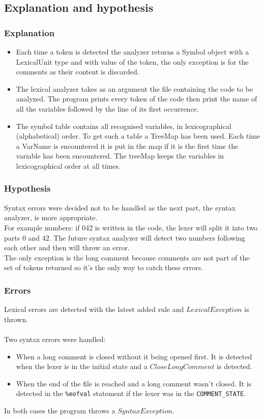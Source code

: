 \documentclass{article}
\begin{document}
\subsection{Explanation and hypothesis}
\subsubsection{Explanation}
\begin{itemize}
    \item Each time a token is detected the analyzer returns a Symbol object with a LexicalUnit type and with value of the token, the only exception is for the comments as their content is discarded.

    \item The lexical analyzer takes as an argument the file containing the code to be analyzed. The program prints every token of the code then print the name of all the variables followed by the line of its first occurrence.

    \item The symbol table contains all recognised variables, in lexicographical (alphabetical) order. To get such a table a TreeMap has been used. Each time a VarName is encountered it is put in the map if it is the first time the variable has been encountered. The treeMap keeps the variables in lexicographical order at all times.
\end{itemize}
\subsubsection{Hypothesis}
Syntax errors were decided not to be handled as the next part, the syntax analyzer, is more appropriate.\\

For example numbers: if 042 is written in the code, the lexer will split it into two parts 0 and 42. The future syntax analyzer will detect two numbers following each other and then will throw an error.\\

The only exception is the long comment because comments are not part of the set of tokens returned so it's the only way to catch these errors.
\subsubsection{Errors}
Lexical errors are detected with the latest added rule and $LexicalException$ is thrown.
\\\\
Two syntax errors were handled:
\begin{itemize}
    \item When a long comment is closed without it being opened first. It is detected when the lexer is in the initial state and a $CloseLongComment$ is detected.
    \item When the end of the file is reached and a long comment wasn't closed. It is detected in the \texttt{\%eofval}  statement if the lexer was in the \texttt{COMMENT\_STATE}.
\end{itemize}
In both cases the program throws a $SyntaxException$.
\end{document}
